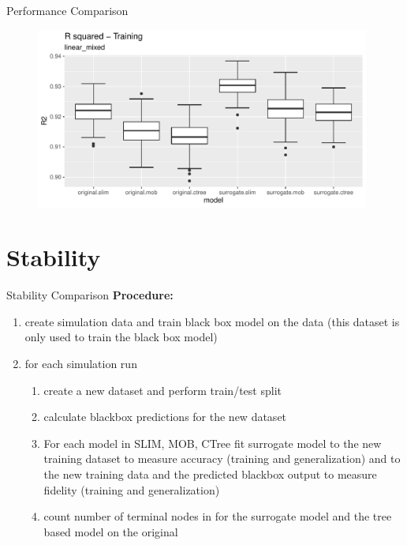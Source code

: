 \documentclass[9pt, xcolor=table]{beamer}
\begin{document}
\begin{frame}{Performance Comparison}
\begin{figure}
    \includegraphics[width=11cm]{Figures/Performance/linear_mixed/r2_train.pdf}
\end{figure}
\end{frame}


\section{Stability}
\begin{frame}{Stability Comparison}
\textbf{Procedure:} 
\begin{enumerate}
    \item create simulation data and train black box model on the data (this dataset is only used to train the black box model)
    \item for each simulation run 
    \begin{enumerate}
        \item create a new dataset and perform train/test split
        \item calculate blackbox predictions for the new dataset
        \item For each model in SLIM, MOB, CTree fit surrogate model to the new training dataset to measure accuracy (training and generalization) and to the new training data and the predicted blackbox output to measure fidelity (training and generalization)
        \item count number of terminal nodes in for the surrogate model and the tree based model on the original 
    \end{enumerate}
\end{enumerate}
\end{frame}
\end{document}
